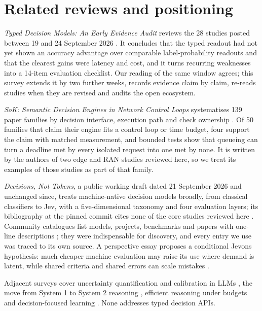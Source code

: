 \section{Related reviews and positioning}\label{sec:related-reviews-and-positioning}

\emph{Typed Decision Models: An Early Evidence Audit} reviews the 28 studies posted between 19 and 24 September 2026 \citep{arxiv2609_32160}. It concludes that the typed readout had not yet shown an accuracy advantage over comparable label-probability readouts and that the clearest gains were latency and cost, and it turns recurring weaknesses into a 14-item evaluation checklist. Our reading of the same window agrees; this survey extends it by two further weeks, records evidence claim by claim, re-reads studies when they are revised and audits the open ecosystem.

\emph{SoK: Semantic Decision Engines in Network Control Loops} systematises 139 paper families by decision interface, execution path and check ownership \citep{arxiv2610_06425}. Of 50 families that claim their engine fits a control loop or time budget, four support the claim with matched measurement, and bounded tests show that queueing can turn a deadline met by every isolated request into one met by none. It is written by the authors of two edge and RAN studies reviewed here, so we treat its examples of those studies as part of that family.

\emph{Decisions, Not Tokens}, a public working draft dated 21 September 2026 and unchanged since, treats machine-native decision models broadly, from classical classifiers to Jev, with a five-dimensional taxonomy and four evaluation layers; its bibliography at the pinned commit cites none of the core studies reviewed here \citep{decisionsnottokens2026}. Community catalogues list models, projects, benchmarks and papers with one-line descriptions \citep{gh_omnijev_awesome_jev_gallery,gh_omnijev_awesome_jev_papers,gh_yifan_lan_awesome_jev_robustness}; they were indispensable for discovery, and every entry we use was traced to its own source. A perspective essay proposes a conditional Jevons hypothesis: much cheaper machine evaluation may raise its use where demand is latent, while shared criteria and shared errors can scale mistakes \citep{arxiv2610_01231}.

Adjacent surveys cover uncertainty quantification and calibration in LLMs \citep{arxiv2503_15850}, the move from System 1 to System 2 reasoning \citep{arxiv2502_17419}, efficient reasoning under budgets \citep{arxiv2503_24377} and decision-focused learning \citep{arxiv2307_13565}. None addresses typed decision APIs.

